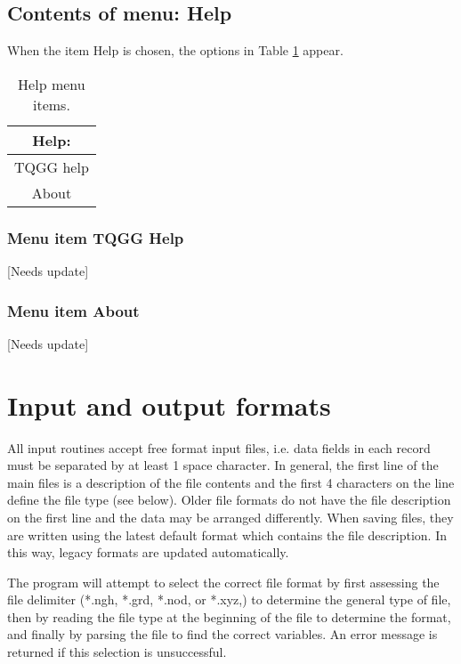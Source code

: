 \documentclass{article}
\begin{document}
\subsection{Contents of menu: Help}
When the item Help is chosen, the options in Table \ref{tab:HELP} appear.

\begin{table}[htb!]
 \caption{Help menu items.}
  \begin{center}
   \begin{tabular}{|c|}
    \hline
Help:\\     \hline
TQGG help \\
About \\
    \hline
   \end{tabular}
   \label{tab:HELP}
  \end{center}
\end{table}


\subsubsection[Menu item TQGG Help]{Menu item TQGG Help}
[Needs update]

\subsubsection[Menu item About]{Menu item About}
[Needs update]



\section{Input and output formats} \label{sec:formats}

All input routines accept free format input files, i.e. data fields in each record must be separated by at least 1 space character.
In general, the first line of the main files is a description of the file contents and the first 4 characters
on the line define the file type (see below). Older file formats do not have the file description on the first line and the data
may be arranged differently. When saving files, they are written using the latest default format which contains
the file description. In this way, legacy formats are updated automatically.

The program will attempt to select the correct file format by first assessing the file delimiter (*.ngh, *.grd, *.nod, or *.xyz,)
to determine the general type of file, then
by reading the file type at the beginning of the file to determine the format, and finally by parsing the file to find the correct variables. An error message is returned if this selection is unsuccessful.
\end{document}
